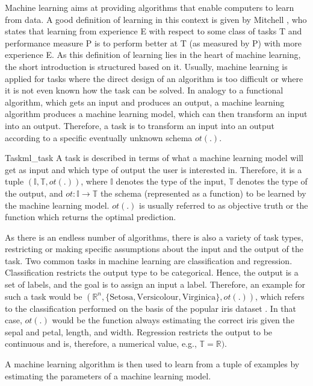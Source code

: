 \documentclass[../../../thesis]{subfiles}
\begin{document}
Machine learning aims at providing algorithms that enable computers to learn from data. A good definition of learning in this context is given by Mitchell \cite{mitchell1997machine}, who states that learning from experience E with respect to some class of tasks T and performance measure P is to perform better at T (as measured by P) with more experience E.
As this definition of learning lies in the heart of machine learning, the short introduction is structured based on it.
Usually, machine learning is applied for tasks where the direct design of an algorithm is too difficult or where it is not even known how the task can be solved. In analogy to a functional algorithm, which gets an input and produces an output, a machine learning algorithm produces a machine learning model, which can then transform an input into an output. Therefore, a task is to transform an input into an output according to a specific eventually unknown schema $ot(.)$. \cite{bengio2017deep}

\begin{Def}{Task}{ml_task}
A task is described in terms of what a machine learning model will get as input and which type of output the user is interested in. Therefore, it is a tuple $(\mathbb{I}, \mathbb{T}, ot(.))$, where $\mathbb{I}$ denotes the type of the input, $\mathbb{T}$ denotes the type of the output, and $ot: \mathbb{I} \to \mathbb{T}$ the schema (represented as a function) to be learned by the machine learning model. $ot(.)$ is usually referred to as objective truth or the function which returns the optimal prediction.
\end{Def}

As there is an endless number of algorithms, there is also a variety of task types, restricting or making specific assumptions about the input and the output of the task. Two common tasks in machine learning are classification and regression. Classification restricts the output type to be categorical. Hence, the output is a set of labels, and the goal is to assign an input a label. Therefore, an example for such a task would be $(\mathbb{R}^n, \{\text{Setosa},\text{Versicolour},\text{Virginica}\},ot(.))$, which refers to the classification performed on the basis of the popular iris dataset \cite{iris}. In that case, $ot(.)$ would be the function always estimating the correct iris given the sepal and petal, length, and width. Regression restricts the output to be continuous and is, therefore, a numerical value, e.g., $\mathbb{T} = \mathbb{R})$.

A machine learning algorithm is then used to learn from a tuple of examples by estimating the parameters of a machine learning model.
\end{document}

